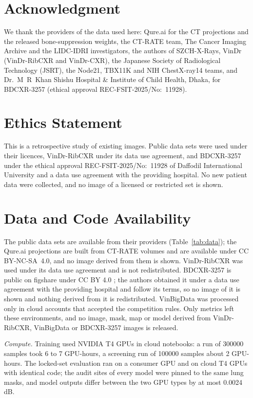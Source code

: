 \section*{Acknowledgment}
We thank the providers of the data used here: Qure.ai for the CT projections and the released bone-suppression weights, the CT-RATE team,
The Cancer Imaging Archive and the LIDC-IDRI investigators, the authors of SZCH-X-Rays, VinDr (VinDr-RibCXR and VinDr-CXR), the Japanese
Society of Radiological Technology (JSRT), the Node21, TBX11K and NIH ChestX-ray14 teams, and Dr.~M~R~Khan Shishu Hospital \& Institute of
Child Health, Dhaka, for BDCXR-3257 (ethical approval REC-FSIT-2025/No:~11928). 

\section*{Ethics Statement}
This is a retrospective study of existing images. Public data sets were used under their licences, VinDr-RibCXR under its data use
agreement, and BDCXR-3257 under the ethical approval REC-FSIT-2025/No:~11928 of Daffodil International University and a data use agreement
with the providing hospital. No new patient data were collected, and no image of a licensed or restricted set is shown.

\section*{Data and Code Availability}
The public data sets are available from their providers (Table~\ref{tab:data}); the Qure.ai projections are built from CT-RATE volumes
\cite{hamamci2026ctrate} and are available under CC BY-NC-SA~4.0, and no image derived from them is shown. VinDr-RibCXR was used under its
data use agreement and is not redistributed. BDCXR-3257 is public on figshare under CC BY 4.0 \cite{durjoy2026bdcxr}; the authors obtained
it under a data use agreement with the providing hospital and follow its terms, so no image of it is shown and nothing derived from it is
redistributed. VinBigData was processed only in cloud accounts that accepted the competition rules. Only metrics left these environments,
and no image, mask, map or model derived from VinDr-RibCXR, VinBigData or BDCXR-3257 images is released.

\emph{Compute.} Training used NVIDIA T4 GPUs in cloud notebooks: a run of \num{300000} samples took 6 to 7 GPU-hours, a screening run of
\num{100000} samples about 2 GPU-hours. The locked-set evaluation ran on a consumer GPU and on cloud T4 GPUs with identical code; the audit
sites of every model were pinned to the same lung masks, and model outputs differ between the two GPU types by at most 0.0024\,dB.

